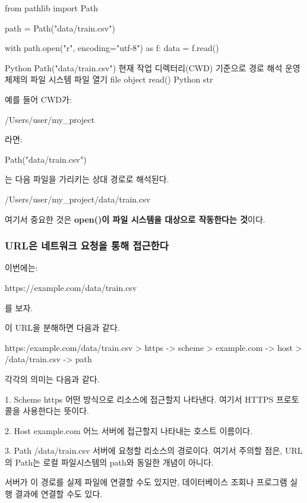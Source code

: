 \begin{dhkcode}
from pathlib import Path

path = Path("data/train.csv")

with path.open("r", encoding="utf-8") as f:
    data = f.read()
\end{dhkcode}

\begin{dhksmry}[centered]
Python
\da
Path("data/train.csv")
\da
현재 작업 디렉터리(CWD) 기준으로 경로 해석
\da
운영체제의 파일 시스템
\da
파일 열기
\da
file object
\da
read()
\da
Python str
\end{dhksmry}

예를 들어 CWD가:

\begin{dhkzsh}
/Users/user/my_project
\end{dhkzsh}

라면:

\begin{dhkcode}
Path("data/train.csv")
\end{dhkcode}

는 다음 파일을 가리키는 상대 경로로 해석된다.

\begin{dhkzsh}
/Users/user/my_project/data/train.csv
\end{dhkzsh}

여기서 중요한 것은 \textbf{open()이 파일 시스템을 대상으로 작동한다는 것}이다.

\subsubsection{URL은 네트워크 요청을 통해 접근한다}

이번에는:

\begin{dhkzsh}
https://example.com/data/train.csv
\end{dhkzsh}

를 보자.

이 URL을 분해하면 다음과 같다.

\begin{dhkdir}
https:/example.com/data/train.csv
> https -> scheme
> example.com -> host
> /data/train.csv -> path
\end{dhkdir}

각각의 의미는 다음과 같다.

\begin{dhksmry}
    1. Scheme
        https
        어떤 방식으로 리소스에 접근할지 나타낸다.
        여기서 HTTPS 프로토콜을 사용한다는 뜻이다.


    2. Host
        example.com
        어느 서버에 접근할지 나타내는 호스트 이름이다.


    3. Path
        /data/train.csv
        서버에 요청할 리소스의 경로이다.
        여기서 주의할 점은,
        URL의 Path는 로컬 파일시스템의 path와 동일한 개념이 아니다.
    
    서버가 이 경로를 실제 파일에 연결할 수도 있지만,
    데이터베이스 조회나 프로그램 실행 결과에 연결할 수도 있다.
\end{dhksmry}

